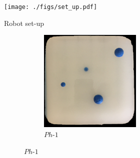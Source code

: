 \documentclass[]{interact}
\theoremstyle{plain}%
\theoremstyle{definition}
\theoremstyle{remark}
\begin{document}
\begin{figure}[]
	\centering
	\begin{subfigure}[b]{.63\textwidth}
		\centering
		\texttt{[image: ./figs/set\_up.pdf]}
		\caption{Robot set-up}
		\label{exp:robot}
	\end{subfigure}
	\hspace{0.02\textwidth}
	\begin{subfigure}[b]{0.3\textwidth}
		\begin{subfigure}[b]{\textwidth}
			\centering
			\begin{subfigure}[b]{\textwidth}
				\includegraphics[width=\textwidth]{./figs/phantom.jpg}
				\caption{$Ph\text{-}1$}
				\label{ph1}
			\end{subfigure} 
			\vspace{-0.3cm}
		\end{subfigure}
		\begin{subfigure}[b]{\textwidth}
			\centering
			\begin{subfigure}[b]{\textwidth}

\end{subfigure}
\end{subfigure}
\end{subfigure}
\end{figure}
\end{document}
